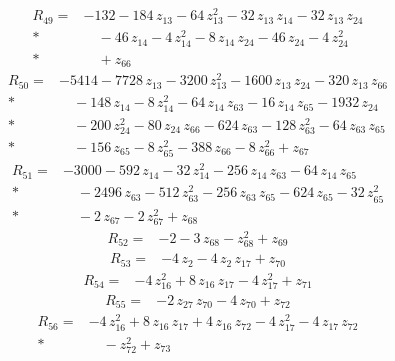\documentclass[10pt]{article}
\begin{document}
\begin{align*}
R_{49}={}& - 132 - 184\,z_{13} - 64\,z_{13}^{2} - 32\,z_{13}\,z_{14} - 32\,z_{13}\,z_{24} \\*
&\quad - 46\,z_{14} - 4\,z_{14}^{2} - 8\,z_{14}\,z_{24} - 46\,z_{24} - 4\,z_{24}^{2} \\*
&\quad + z_{66}
\end{align*}
\begin{align*}
R_{50}={}& - 5414 - 7728\,z_{13} - 3200\,z_{13}^{2} - 1600\,z_{13}\,z_{24} - 320\,z_{13}\,z_{66} \\*
&\quad - 148\,z_{14} - 8\,z_{14}^{2} - 64\,z_{14}\,z_{63} - 16\,z_{14}\,z_{65} - 1932\,z_{24} \\*
&\quad - 200\,z_{24}^{2} - 80\,z_{24}\,z_{66} - 624\,z_{63} - 128\,z_{63}^{2} - 64\,z_{63}\,z_{65} \\*
&\quad - 156\,z_{65} - 8\,z_{65}^{2} - 388\,z_{66} - 8\,z_{66}^{2} + z_{67}
\end{align*}
\begin{align*}
R_{51}={}& - 3000 - 592\,z_{14} - 32\,z_{14}^{2} - 256\,z_{14}\,z_{63} - 64\,z_{14}\,z_{65} \\*
&\quad - 2496\,z_{63} - 512\,z_{63}^{2} - 256\,z_{63}\,z_{65} - 624\,z_{65} - 32\,z_{65}^{2} \\*
&\quad - 2\,z_{67} - 2\,z_{67}^{2} + z_{68}
\end{align*}
\begin{align*}
R_{52}={}& - 2 - 3\,z_{68} - z_{68}^{2} + z_{69}
\end{align*}
\begin{align*}
R_{53}={}& - 4\,z_{2} - 4\,z_{2}\,z_{17} + z_{70}
\end{align*}
\begin{align*}
R_{54}={}& - 4\,z_{16}^{2} + 8\,z_{16}\,z_{17} - 4\,z_{17}^{2} + z_{71}
\end{align*}
\begin{align*}
R_{55}={}& - 2\,z_{27}\,z_{70} - 4\,z_{70} + z_{72}
\end{align*}
\begin{align*}
R_{56}={}& - 4\,z_{16}^{2} + 8\,z_{16}\,z_{17} + 4\,z_{16}\,z_{72} - 4\,z_{17}^{2} - 4\,z_{17}\,z_{72} \\*
&\quad - z_{72}^{2} + z_{73}
\end{align*}
\end{document}
